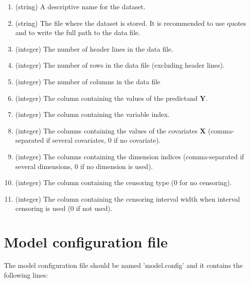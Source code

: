 \documentclass[a4paper]{article}
\begin{document}
	\begin{enumerate}
		\item (string) A descriptive name for the dataset.
		\item (string) The file where the dataset is stored. It is recommended to use quotes and to write the full path to the data file.
		\item (integer) The number of header lines in the data file.
		\item (integer) The number of rows in the data file (excluding header lines).
		\item (integer) The number of columns in the data file
		\item (integer) The column containing the values of the predictand $\boldsymbol{Y}$.
		\item (integer) The column containing the variable index.
		\item (integer) The columns containing the values of the covariates $\boldsymbol{X}$ (comma-separated if several covariates, 0 if no covariate).
		\item (integer) The columns containing the dimension indices (comma-separated if several dimensions, 0 if no dimension is used).
		\item (integer) The column containing the censoring type (0 for no censoring).
		\item (integer) The column containing the censoring interval width when interval censoring is used (0 if not used).
	\end{enumerate}
	
	\section{Model configuration file}
	
	The model configuration file should be named 'model.config' and it contains the following lines:
	
\end{document}
